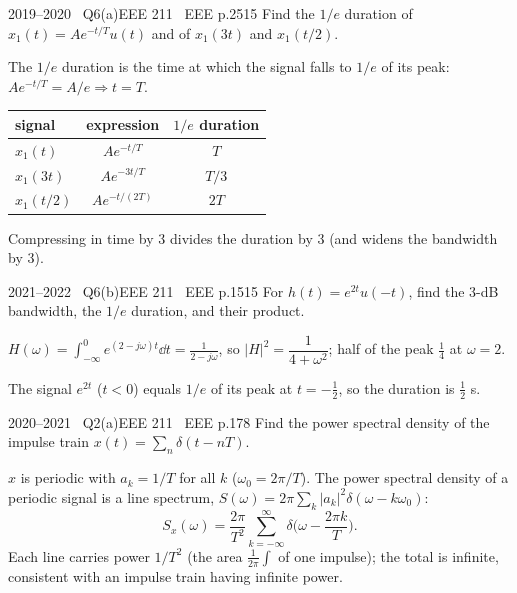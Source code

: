 \begin{qcard}{2019--2020 \textbullet\ Q6(a)}{EEE 211 \textbullet\ EEE p.25}{15}
Find the $1/e$ duration of $x_1(t)=Ae^{-t/T}u(t)$ and of $x_1(3t)$ and $x_1(t/2)$.
\end{qcard}
\begin{solution}
The $1/e$ duration is the time at which the signal falls to $1/e$ of its peak: $Ae^{-t/T}=A/e\Rightarrow t=T$.
\begin{center}\small\begin{tabular}{@{}lcc@{}}\toprule signal&expression&$1/e$ duration\\\midrule$x_1(t)$&$Ae^{-t/T}$&$T$\\$x_1(3t)$&$Ae^{-3t/T}$&$T/3$\\$x_1(t/2)$&$Ae^{-t/(2T)}$&$2T$\\\bottomrule\end{tabular}\end{center}
Compressing in time by 3 divides the duration by 3 (and widens the bandwidth by 3).
\end{solution}

\begin{qcard}{2021--2022 \textbullet\ Q6(b)}{EEE 211 \textbullet\ EEE p.15}{15}
For $h(t)=e^{2t}u(-t)$, find the 3-dB bandwidth, the $1/e$ duration, and their product.
\end{qcard}
\begin{solution}
$H(\omega)=\displaystyle\int_{-\infty}^0e^{(2-j\omega)t}\dd t=\frac1{2-j\omega}$, so $|H|^2=\dfrac1{4+\omega^2}$; half of the peak $\frac14$ at $\omega=2$.

The signal $e^{2t}$ ($t<0$) equals $1/e$ of its peak at $t=-\frac12$, so the duration is $\frac12$ s.
\end{solution}

\begin{qcard}{2020--2021 \textbullet\ Q2(a)}{EEE 211 \textbullet\ EEE p.17}{8}
Find the power spectral density of the impulse train $x(t)=\sum_n\delta(t-nT)$.
\end{qcard}
\begin{solution}
$x$ is periodic with $a_k=1/T$ for all $k$ ($\omega_0=2\pi/T$). The power spectral density of a periodic signal is a line spectrum, $S(\omega)=2\pi\sum_k|a_k|^2\delta(\omega-k\omega_0)$:
\[S_x(\omega)=\frac{2\pi}{T^2}\sum_{k=-\infty}^{\infty}\delta\Big(\omega-\frac{2\pi k}T\Big).\]
Each line carries power $1/T^2$ (the area $\frac1{2\pi}\int$ of one impulse); the total is infinite, consistent with an impulse train having infinite power.
\end{solution}

